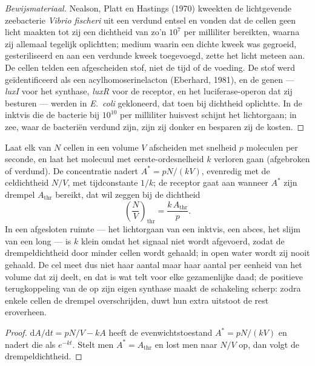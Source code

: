 \begin{proof}[Bewijsmateriaal]
Nealson, Platt en Hastings (1970) kweekten de lichtgevende
zeebacterie \emph{Vibrio fischeri} uit een verdund entsel en vonden dat
de cellen geen licht maakten tot zij een dichtheid van zo'n $10^{7}$
per milliliter bereikten, waarna zij allemaal tegelijk oplichtten;
medium waarin een dichte kweek was gegroeid, gesteriliseerd en aan een
verdunde kweek toegevoegd, zette het licht meteen aan. De cellen telden
een afgescheiden stof, niet de tijd of de voeding. De stof werd
geïdentificeerd als een acylhomoserinelacton (Eberhard, 1981), en de
genen --- \emph{luxI} voor het synthase, \emph{luxR} voor de receptor,
en het luciferase-operon dat zij besturen --- werden in \emph{E.~coli}
gekloneerd, dat toen bij dichtheid oplichtte. In de inktvis die de
bacterie bij $10^{10}$ per milliliter huisvest schijnt het lichtorgaan;
in zee, waar de bacteriën verdund zijn, zijn zij donker en besparen zij
de kosten.
\end{proof}

\begin{proposition}\label{prop:b3:bacteriology:threshold}
Laat elk van $N$ cellen in een volume $V$  afscheiden met
snelheid $p$ moleculen per seconde, en laat het molecuul met
eerste-ordesnelheid $k$ verloren gaan (afgebroken of verdund). De
concentratie nadert $A^{*} = pN/(kV)$, evenredig met de celdichtheid
$N/V$, met tijdconstante $1/k$; de receptor gaat aan wanneer $A^{*}$
zijn drempel $A_{\text{thr}}$ bereikt, dat wil zeggen bij de dichtheid
\[
\left(\frac{N}{V}\right)_{\text{thr}} = \frac{k\,A_{\text{thr}}}{p}.
\]
In een afgesloten ruimte --- het lichtorgaan van een inktvis, een
abces, het slijm van een long --- is $k$ klein omdat het signaal niet
wordt afgevoerd, zodat de drempeldichtheid door minder cellen wordt
gehaald; in open water wordt zij nooit gehaald. De cel meet dus niet
haar aantal maar haar aantal per eenheid van het volume dat zij deelt,
en dat is wat telt voor elke gezamenlijke daad; de positieve
terugkoppeling van de  op zijn eigen synthase maakt de
schakeling scherp: zodra enkele cellen de drempel overschrijden, duwt
hun extra uitstoot de rest eroverheen.
\end{proposition}
\begin{proof}
$\mathrm{d}A/\mathrm{d}t = pN/V - kA$ heeft de evenwichtstoestand
$A^{*} =
pN/(kV)$ en nadert die als $e^{-kt}$. Stelt men $A^{*} = A_{\text{thr}}$
en lost men naar $N/V$ op, dan volgt de drempeldichtheid.
\end{proof}

